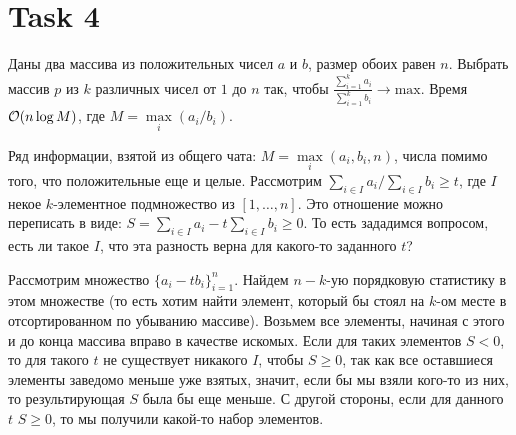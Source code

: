 \section{Task 4}
\begin{task}
    Даны два массива из положительных чисел $a$ и $b$, размер обоих равен $n$. Выбрать массив $p$ из $k$ различных чисел от $1$ до $n$ так, чтобы $\frac{\sum_{i=1}^ka_i}{\sum_{i=1}^kb_i}\to\text{max}$. Время $\mathcal{O}(n\log M)$, где $M =\max\limits_i(a_i/b_i)$.
\end{task}

\begin{solution}
    Ряд информации, взятой из общего чата: $M=\max\limits_i(a_i,b_i,n)$, числа помимо того, что положительные еще и целые.
    Рассмотрим $\sum_{i\in I} a_{i} / \sum_{i\in I} b_i \geq t$, где $I$ некое $k$-элементное подмножество из $[1,\ldots,n]$. Это отношение можно переписать в виде: $S = \sum_{i\in I} a_{i} - t\sum_{i\in I} b_i \geq 0$. То есть зададимся вопросом, есть ли такое $I$, что эта разность верна для какого-то заданного $t$?
    
    Рассмотрим множество $\{a_i - tb_i\}_{i=1}^n$. Найдем $n-k$-ую порядковую статистику в этом множестве (то есть хотим найти элемент, который бы стоял на $k$-ом месте в отсортированном по убыванию массиве). Возьмем все элементы, начиная с этого и до конца массива вправо в качестве искомых. Если для таких элементов $S<0$, то для такого $t$ не существует никакого $I$, чтобы $S\geq 0$, так как все оставшиеся элементы заведомо меньше уже взятых, значит, если бы мы взяли кого-то из них, то результирующая $S$ была бы еще меньше. С другой стороны, если для данного $t$ $S\geq0$, то мы получили какой-то набор элементов.
    

\end{solution}
